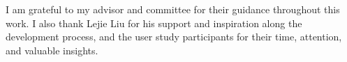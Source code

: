 \documentclass{dcthesis}
\theoremstyle{definition}
\theoremstyle{remark}
\begin{document}
I am grateful to my advisor and committee for their guidance throughout this work. I also thank Lejie Liu for his support and inspiration along the development process, and the user study participants for their time, attention, and valuable insights.

\tableofcontents

\listoftables
\listoffigures

\mainmatter








\appendix




\backmatter


{}

\end{document}
